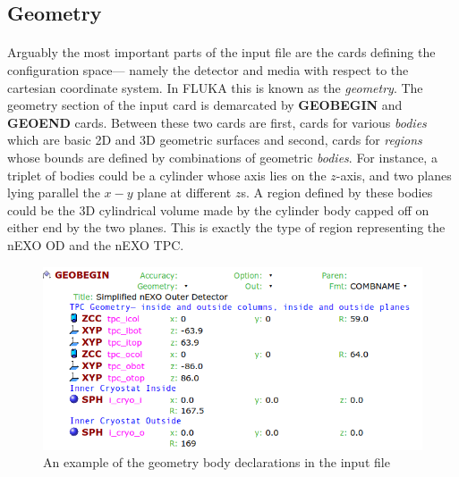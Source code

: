 \subsection{Geometry}

\paragraph{}
Arguably the most important parts of the input file are the cards defining the configuration space— namely the detector and media with respect to the cartesian coordinate system. In FLUKA this is known as the \textit{geometry}. The geometry section of the input card is demarcated by \textbf{GEOBEGIN} and \textbf{GEOEND} cards. Between these two cards are first, cards for various \textit{bodies} which are basic 2D and 3D geometric surfaces and second, cards for \textit{regions} whose bounds are defined by combinations of geometric \textit{bodies}. For instance, a triplet of bodies could be a cylinder whose axis lies on the $z$-axis, and two planes lying parallel the $x-y$ plane at different $z$s. A region defined by these bodies could be the 3D cylindrical volume made by the cylinder body capped off on either end by the two planes. This is exactly the type of region representing the nEXO OD and the nEXO TPC. 

\begin{figure}[h]
    \begin{center}
    \includegraphics[scale=0.5]{figures/geometry_1.png}
    \caption{An example of the geometry body declarations in the input file}
    \label{fig:geometry1}
    \end{center}
\end{figure}

